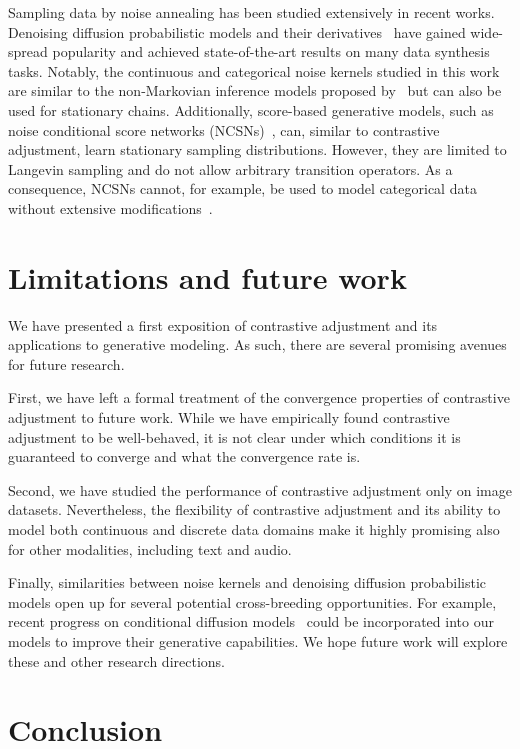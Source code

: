 \documentclass[10pt,twocolumn,letterpaper]{article}
\begin{document}
Sampling data by noise annealing has been studied extensively in recent works.
Denoising diffusion probabilistic models and their derivatives~\cite{sohl2015deep,ho2020denoising} have gained wide-spread popularity and achieved state-of-the-art results on many data synthesis tasks.
Notably, the continuous and categorical noise kernels studied in this work are similar to the non-Markovian inference models proposed by~\textcite{song2021denoising} but can also be used for stationary chains.
Additionally, score-based generative models, such as noise conditional score networks (NCSNs)~\cite{song2019generative}, can, similar to contrastive adjustment, learn stationary sampling distributions.
However, they are limited to Langevin sampling and do not allow arbitrary transition operators.
As a consequence, NCSNs cannot, for example, be used to model categorical data without extensive modifications~\cite{meng2022concrete}.


\section{Limitations and future work}

We have presented a first exposition of contrastive adjustment and its applications to generative modeling.
As such, there are several promising avenues for future research.

First, we have left a formal treatment of the convergence properties of contrastive adjustment to future work.
While we have empirically found contrastive adjustment to be well-behaved, it is not clear under which conditions it is guaranteed to converge and what the convergence rate is.

Second, we have studied the performance of contrastive adjustment only on image datasets.
Nevertheless, the flexibility of contrastive adjustment and its ability to model both continuous and discrete data domains make it highly promising also for other modalities, including text and audio.

Finally, similarities between noise kernels and denoising diffusion probabilistic models open up for several potential cross-breeding opportunities.
For example, recent progress on conditional diffusion models~\cite{wang22ddnm,zhang23controlnet} could be incorporated into our models to improve their generative capabilities.
We hope future work will explore these and other research directions.


\section{Conclusion}
\end{document}
